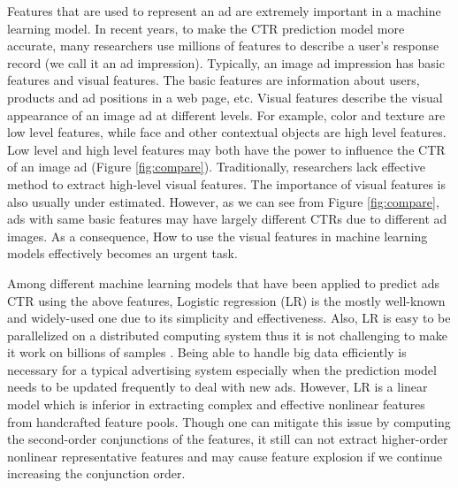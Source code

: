\documentclass{sig-alternate-05-2015}
\begin{document}
Features that are used to represent an ad are extremely important in a machine learning model. In recent years, to make the CTR prediction model more accurate, many researchers use millions of features to describe a user's response record (we call it an ad impression). Typically, an image ad impression has basic features and visual features. The basic features are information about users, products and ad positions in a web page, etc. Visual features describe the visual appearance of an image ad at different levels. For example, color and  texture are low level features, while face and other contextual objects are high level features. Low level and high level features may both have the power to influence the CTR of an image ad (Figure \ref{fig:compare}). Traditionally,  researchers lack effective  method to extract  high-level visual features. The importance of visual features is also usually under estimated. However, as we can see from Figure \ref{fig:compare}, ads with same basic features may have largely different CTRs due to different ad images. As a consequence, How to use the visual features in machine learning models effectively becomes an urgent task.

Among different machine learning models that have been applied to predict ads CTR using the above features, Logistic regression (LR) is the mostly well-known and widely-used one due to its simplicity and effectiveness. Also, LR is easy to be parallelized on a distributed computing system thus it is not challenging to make it work on billions of samples \cite{chapelle2014simple}. Being able to handle big data efficiently is necessary for a typical advertising system especially when the prediction model needs to be updated frequently to deal with new ads. However, LR is a linear model which is inferior in extracting complex and effective nonlinear features from handcrafted feature pools. Though one can mitigate this issue by computing the second-order conjunctions of the features, it still can not extract higher-order nonlinear representative features and may cause feature explosion if we continue increasing the conjunction order. %
\end{document}
